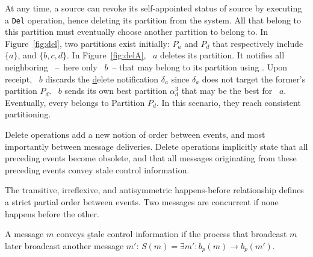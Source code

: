 At any time, a source can revoke its self-appointed status of source
by executing a \texttt{Del} operation, hence deleting its partition
from the system. All \processes that belong to this partition must
eventually choose another partition to belong to. In
Figure~\ref{fig:del}, two partitions exist initially: $P_a$ and $P_d$
that respectively include $\{a\}$, and $\{b, c, d\}$. In
Figure~\ref{fig:delA}, \Process~$a$ deletes its partition. It notifies
all neighboring \processes~--~here only \Process~$b$~-- that may
belong to its partition using \NAMEB. Upon receipt, \Process~$b$
discards the \underline{d}elete notification $\delta_a$ since
$\delta_a$ does not target the former's partition $P_d$. \Process~$b$
sends its own best partition $\alpha_d^3$ that may be the best for
\Process~$a$. Eventually, every \process belongs to Partition
$P_d$. In this scenario, they reach consistent partitioning.

Delete operations add a new notion of order between events, and most
importantly between message deliveries. Delete operations implicitly
state that all preceding events become obsolete, and that all messages
originating from these preceding events convey stale control
information.

\begin{definition}
  The transitive, irreflexive, and antisymmetric happens-before
  relationship defines a strict partial order between events. Two
  messages are concurrent if none happens before the other.
\end{definition}

\begin{definition}
  A message $m$ conveys \underline{s}tale control information if the
  process that broadcast $m$ later broadcast another message $m'$:
  $S(m) = \exists m': b_p(m) \rightarrow b_p(m')$.

\end{definition}






